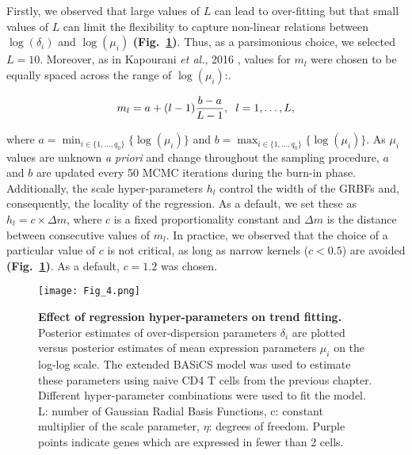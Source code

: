 Firstly, we observed that large values of $L$ can lead to over-fitting but that small values of $L$ can limit the flexibility to capture non-linear relations between $\log(\delta_i)$ and $\log(\mu_i)$ \textbf{(Fig.~\ref{fig2:choice_hyper})}. 
Thus, as a parsimonious choice, we selected $L = 10$. Moreover, as in Kapourani \emph{et al.}, 2016 \cite{Kapourani2016}, values for $m_l$ were chosen to be equally spaced across the range of $\log(\mu_i)$:. 

\begin{equation} m_l = a + (l-1)\frac{b - a }{L-1}, \hspace{0.2cm}  l=1,\ldots, L, \end{equation} 

where $a=\min_{i\in\{1,\ldots,q_0\}}\{\log(\mu_i)\}$ and $b=\max_{i\in\{1,\ldots,q_0\}}\{\log(\mu_i)\}$. 
As $\mu_i$ values are unknown \emph{a priori} and change throughout the sampling procedure, $a$ and $b$ are updated every 50 MCMC iterations during the burn-in phase. 
Additionally, the scale hyper-parameters $h_l$ control the width of the GRBFs and, consequently, the locality of the regression. 
As a default, we set these as $h_l = c \times \Delta m$, where $c$ is a fixed proportionality constant and $\Delta m$ is the distance between consecutive values of $m_l$. 
In practice, we observed that the choice of a particular value of $c$ is not critical, as long as narrow kernels ($c<0.5$) are avoided \textbf{(Fig.~\ref{fig2:choice_hyper})}. 
As a default, $c = 1.2$ was chosen. 

\begin{figure}[!h]
\centering
\texttt{[image: Fig\_4.png]}
\caption[Effect of regression hyper-parameters on trend fitting]{\textbf{Effect of regression hyper-parameters on trend fitting.}\\
Posterior estimates of over-dispersion parameters $\delta_i$ are plotted versus posterior estimates of mean expression parameters $\mu_i$ on the log-log scale. 
The extended BASiCS model was used to estimate these parameters using naive CD4\plus{} T cells from the previous chapter. 
Different hyper-parameter combinations were used to fit the model. 
L: number of Gaussian Radial Basis Functions, c: constant multiplier of the scale parameter, $\eta$: degrees of freedom. 
Purple points indicate genes which are expressed in fewer than 2 cells.}
\label{fig2:choice_hyper}
\end{figure}

\newpage

